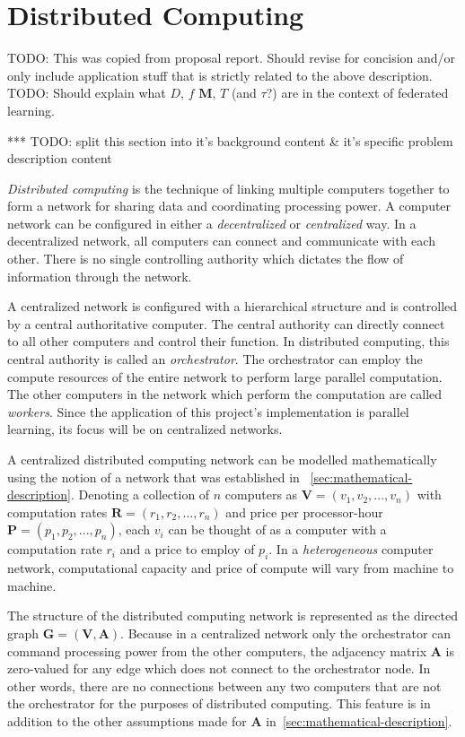\documentclass[../mthe-493-final-project.tex]{subfiles}
\begin{document}
    \section{Distributed Computing}
    \label{sec:Distributed-Computing}

    TODO: This was copied from proposal report. Should revise for concision and/or only include application stuff that is strictly related to the above description.
    TODO: Should explain what $D$, $f$ $\mathbf{M}$, $T$ (and $\tau$?) are in the context of federated learning.
    
    ***
    TODO: split this section into it's background content & it's specific problem description content

    \textit{Distributed computing} is the technique of linking multiple computers together to form a network for sharing data and coordinating processing power. A computer network can be configured in either a \textit{decentralized} or \textit{centralized} way. In a decentralized network, all computers can connect and communicate with each other. There is no single controlling authority which dictates the flow of information through the network.

    A centralized network is configured with a hierarchical structure and is controlled by a central authoritative computer. The central authority can directly connect to all other computers and control their function. In distributed computing, this central authority is called an \textit{orchestrator}. The orchestrator can employ the compute resources of the entire network to perform large parallel computation. The other computers in the network which perform the computation are called \textit{workers}. Since the application of this project's implementation is parallel learning, its focus will be on centralized networks.

    A centralized distributed computing network can be modelled mathematically using the notion of a network that was established in ~\autoref{sec:mathematical-description}. Denoting a collection of $n$ computers as $\mathbf{V} = (v_1, v_2, ..., v_n)$ with computation rates $\mathbf{R} = (r_1, r_2, ..., r_n)$ and price per processor-hour $\mathbf{P} = (p_1, p_2, ..., p_n)$, each $v_i$ can be thought of as a computer with a computation rate $r_i$ and a price to employ of $p_i$. In a \textit{heterogeneous} computer network, computational capacity and price of compute will vary from machine to machine.

    The structure of the distributed computing network is represented as the directed graph $\mathbf{G} = (\mathbf{V}, \mathbf{A})$. Because in a centralized network only the orchestrator can command processing power from the other computers, the adjacency matrix $\mathbf{A}$ is zero-valued for any edge which does not connect to the orchestrator node. In other words, there are no connections between any two computers that are not the orchestrator for the purposes of distributed computing. This feature is in addition to the other assumptions made for $\mathbf{A}$ in~\autoref{sec:mathematical-description}.
\end{document}
